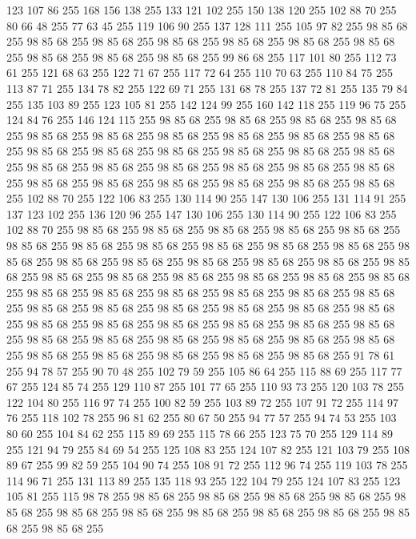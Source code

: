 123 107 86 255 168 156 138 255 133 121 102 255 150 138 120 255 102 88 70 255 80 66 48 255 77 63 45 255 119 106 90 255 137 128 111 255 105 97 82 255 98 85 68 255 98 85 68 255 98 85 68 255 98 85 68 255 98 85 68 255 98 85 68 255 98 85 68 255 98 85 68 255 98 85 68 255 98 85 68 255 99 86 68 255 117 101 80 255 112 73 61 255 121 68 63 255 122 71 67 255 117 72 64 255 110 70 63 255 110 84 75 255 113 87 71 255 134 78 82 255 122 69 71 255 131 68 78 255 137 72 81 255 135 79 84 255 135 103 89 255 123 105 81 255 142 124 99 255 160 142 118 255 119 96 75 255 124 84 76 255 146 124 115 255 98 85 68 255 98 85 68 255 98 85 68 255 98 85 68 255 98 85 68 255 98 85 68 255 98 85 68 255 98 85 68 255 98 85 68 255 98 85 68 255 98 85 68 255 98 85 68 255 98 85 68 255 98 85 68 255 98 85 68 255 98 85 68 255 98 85 68 255 98 85 68 255 98 85 68 255 98 85 68 255 98 85 68 255 98 85 68 255 98 85 68 255
98 85 68 255 98 85 68 255 98 85 68 255 98 85 68 255 98 85 68 255 102 88 70 255 122 106 83 255 130 114 90 255 147 130 106 255 131 114 91 255 137 123 102 255 136 120 96 255 147 130 106 255 130 114 90 255 122 106 83 255 102 88 70 255 98 85 68 255 98 85 68 255 98 85 68 255 98 85 68 255 98 85 68 255 98 85 68 255 98 85 68 255 98 85 68 255 98 85 68 255 98 85 68 255 98 85 68 255 98 85 68 255 98 85 68 255 98 85 68 255 98 85 68 255 98 85 68 255 98 85 68 255 98 85 68 255 98 85 68 255 98 85 68 255 98 85 68 255 98 85 68 255 98 85 68 255 98 85 68 255 98 85 68 255 98 85 68 255 98 85 68 255 98 85 68 255 98 85 68 255 98 85 68 255 98 85 68 255 98 85 68 255 98 85 68 255 98 85 68 255 98 85 68 255 98 85 68 255 98 85 68 255 98 85 68 255 98 85 68 255 98 85 68 255 98 85 68 255 98 85 68 255 98 85 68 255 98 85 68 255 98 85 68 255 98 85 68 255 98 85 68 255 98 85 68 255
98 85 68 255 98 85 68 255 98 85 68 255 98 85 68 255 98 85 68 255 91 78 61 255 94 78 57 255 90 70 48 255 102 79 59 255 105 86 64 255 115 88 69 255 117 77 67 255 124 85 74 255 129 110 87 255 101 77 65 255 110 93 73 255 120 103 78 255 122 104 80 255 116 97 74 255 100 82 59 255 103 89 72 255 107 91 72 255 114 97 76 255 118 102 78 255 96 81 62 255 80 67 50 255 94 77 57 255 94 74 53 255 103 80 60 255 104 84 62 255 115 89 69 255 115 78 66 255 123 75 70 255 129 114 89 255 121 94 79 255 84 69 54 255 125 108 83 255 124 107 82 255 121 103 79 255 108 89 67 255 99 82 59 255 104 90 74 255 108 91 72 255 112 96 74 255 119 103 78 255 114 96 71 255 131 113 89 255 135 118 93 255 122 104 79 255 124 107 83 255 123 105 81 255 115 98 78 255 98 85 68 255 98 85 68 255 98 85 68 255 98 85 68 255 98 85 68 255 98 85 68 255 98 85 68 255 98 85 68 255 98 85 68 255 98 85 68 255 98 85 68 255 98 85 68 255
